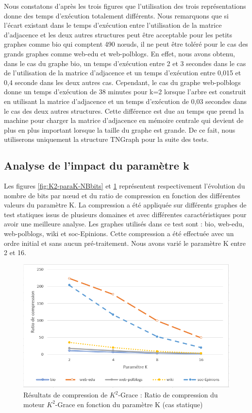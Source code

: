 Nous constatons d'après les trois figures que l'utilisation des trois représentations donne des temps d'exécution totalement différents. Nous remarquons que si l'écart existant dans le temps d'exécution  entre l'utilisation de la matrice d'adjacence  et les deux autres structures peut être acceptable pour les petits graphes comme bio qui comptent 490 nœuds, il ne peut être toléré pour le cas des grands graphes comme web-edu et web-polblogs.
En effet, nous avons obtenu, dans le cas du graphe bio, un temps d'exécution entre 2 et 3 secondes dans le cas de l'utilisation de la matrice d'adjacence et un temps d'exécution entre 0,015 et 0,4 seconde dans les deux autres cas. Cependant, le cas du graphe web-polblogs donne un temps d'exécution de 38 minutes pour k=2 lorsque l'arbre est construit en utilisant la matrice d'adjacence et un temps d'exécution de 0,03 secondes dans le cas des deux autres structures. Cette différence est due au temps que prend la machine pour charger la matrice d'adjacence en mémoire centrale qui devient de plus en plus important lorsque la taille du graphe est grande. De ce fait, nous utiliserons uniquement la structure TNGraph pour la suite des tests.

			\subsection{Analyse de l'impact du paramètre k}
			Les figures \ref{fig:K2-paraK-NBbits} et \ref{fig:K2-paraK-Ratio} représentent respectivement l'évolution du nombre de bits par nœud et du ratio de compression en fonction des différentes valeurs du paramètre K. La compression a été appliquée sur différents graphes de test statiques issus de plusieurs domaines et avec différentes caractéristiques pour avoir une meilleure analyse. Les graphes utilisés dans ce test sont : bio, web-edu, web-polblogs, wiki et soc-Epinions. Cette compression a été effectuée avec un ordre initial et sans aucun pré-traitement.
 Nous avons varié le paramètre K entre 2 et 16.
			
\begin{figure}[H]
	\centering
	\includegraphics[scale=0.8]{ressources/image/Tests/K2-paraK-Ratio.png}
	
	\caption{Résultats de compression de $K^2$-Grace : Ratio de compression du moteur $K^2$-Grace en fonction du paramètre K (cas statique)}
	\label{fig:K2-paraK-Ratio}
\end{figure}

